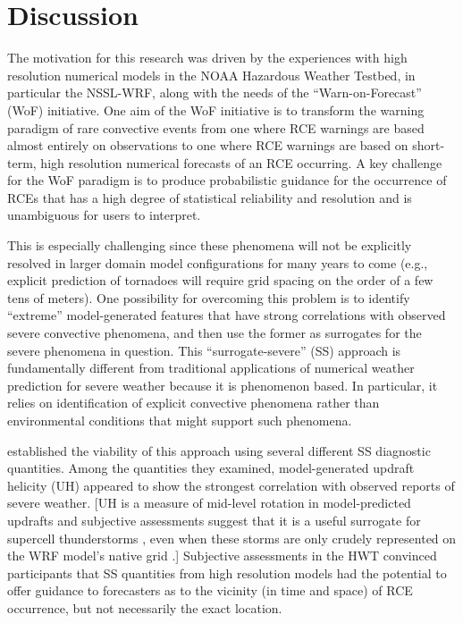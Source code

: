 

\chapter{Discussion}
\label{discussion}


The motivation for this research was driven by the experiences with high resolution numerical models in the NOAA Hazardous Weather Testbed, in particular the NSSL-WRF, along with the needs of the ``Warn-on-Forecast'' (WoF) initiative.
One aim of the WoF initiative is to transform the warning paradigm of rare convective events from one where RCE warnings are based almost entirely on observations to one where RCE warnings are based on short-term, high resolution numerical forecasts of an RCE occurring.
A key challenge for the WoF paradigm is to produce probabilistic guidance for the occurrence of RCEs that has a high degree of statistical reliability and resolution and is unambiguous for users to interpret.


This is especially challenging since these phenomena will not be explicitly resolved in larger domain model configurations for many years to come (e.g., explicit prediction of tornadoes will require grid spacing on the order of a few tens of meters).
One possibility for overcoming this problem is to identify ``extreme'' model-generated features that have strong correlations with observed severe convective phenomena, and then use the former as surrogates for the severe phenomena in question.
This ``surrogate-severe'' (SS) approach is fundamentally different from traditional applications of numerical weather prediction for severe weather because it is phenomenon based.
In particular, it relies on identification of explicit convective phenomena rather than environmental conditions that might support such phenomena.


\cite{Sobash2011} established the viability of this approach using several different SS diagnostic quantities.
Among the quantities they examined, model-generated updraft helicity (UH) appeared to show the strongest correlation with observed reports of severe weather.
[UH is a measure of mid-level rotation in model-predicted updrafts and subjective assessments suggest that it is a useful surrogate for supercell thunderstorms \citep{Kain2010}, even when these storms are only crudely represented on the WRF model's native grid \citep{Kain2008}.]
Subjective assessments in the HWT convinced participants that SS quantities from high resolution models had the potential to offer guidance to forecasters as to the vicinity (in time and space) of RCE occurrence, but not necessarily the exact location.



